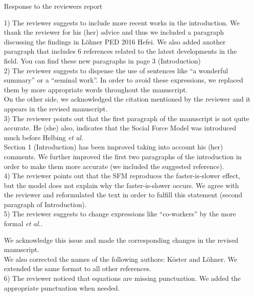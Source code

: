 \documentclass[a4paper,12pt]{letter}
\begin{document}
\begin{letter}{Response to the reviewers report}
{1) The reviewer suggests to include more recent works in the introduction. We thank the reviewer for his (her) advice and thus we included a paragraph discussing the findings in L\"ohner PED 2016 Hefei.
We also added another paragraph that includes 6 references related to the latest developments in the field. You can find these new paragraphs in page 3 (Introduction)  \\

2) The reviewer suggests to dispense the use of sentences like ``a wonderful 
summary'' or a ``seminal work''. In order to avoid these expressions, we 
replaced them by more appropriate words throughout the manuscript. \\

On the other side, we acknowledged the citation mentioned by the reviewer and 
it appears in the revised manuscript. \\

3) The reviewer points out that the first paragraph of the manuscript is not 
quite accurate. He (she) also, indicates that the Social Force Model was introduced much 
before Helbing \textit{et al.} \\

Section 1 (Introduction) has been improved taking into account his (her) 
comments. We further improved the first two paragraphs of the introduction in order to 
make them more accurate (we included the suggested reference). \\ 

4) The reviewer points out that the SFM reproduces the faster-is-slower effect, but the model
does not explain why the faster-is-slower occurs. We agree with the reviewer and reformulated 
the text in order to fulfill this statement (second paragraph of Introduction).\\


5) The reviewer suggests to change expressions like ``co-workers'' by 
the more formal \textit{et al.}. 

We acknowledge this issue and made the corresponding changes in the
revised manuscript. \\

We also corrected the names of the following authors: K\"oster and L\"ohner. We extended the same format to all other references.   \\

6) The reviewer noticed that equations are missing punctuation. We added the appropriate punctuation when needed. \\

}
\end{letter}
\end{document}
